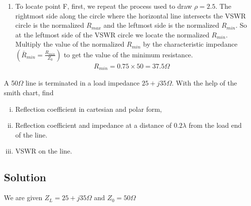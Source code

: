 \begin{example}
\begin{enumerate}
\item To locate point F, first, we repeat the process used to draw $\rho = 2.5$. The rightmost side along the circle where the horizontal line intersects the VSWR circle is the normalized $R_{max}$ and the leftmost side is the normalized $R_{min}$. So at the leftmost side of the VSWR circle we locate the normalized $R_{min}$. Multiply the value of the normalized $R_{min}$ by the characteristic impedance$(\bar{R}_{min} = \frac{R_{min}}{Z_0})$ to get the value of the minimum resistance.
\begin{align*}
R_{min}  = 0.75 \times 50 = 37.5\Omega
\end{align*}
\end{enumerate}
\end{example}

\begin{example}
A 50$\Omega$ line is terminated in a load impedance  $25+j35\Omega$. With the help of the smith chart, find 
\begin{enumerate}[(i)]
\item Reflection coefficient in cartesian and polar form,
\item Reflection coefficient and impedance at a distance of $0.2\lambda$ from the load end of the line.
\item VSWR on the line.
\end{enumerate}
\subsection*{Solution}
We are given $Z_{L}=25+j35\Omega$ and $Z_{0}=50\Omega$


\end{example}
